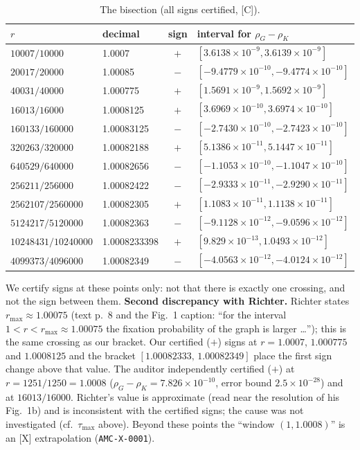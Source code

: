 \documentclass[10pt]{article}
\newcommand{\tier}[1]{\textsf{[#1]}}
\newcommand{\tC}{\tier{C}}
\newcommand{\tX}{\tier{X}}
\begin{document}
\begin{table}[h]\centering\small
\caption{The bisection (all signs certified, \tC{}).}
\begin{tabular}{llcl}\toprule
$r$ & decimal & sign & interval for $\rho_G-\rho_K$\\\midrule
$10007/10000$ & 1.0007 & $+$ & $[3.6138\times10^{-9},3.6139\times10^{-9}]$\\
$20017/20000$ & 1.00085 & $-$ & $[-9.4779\times10^{-10},-9.4774\times10^{-10}]$\\
$40031/40000$ & 1.000775 & $+$ & $[1.5691\times10^{-9},1.5692\times10^{-9}]$\\
$16013/16000$ & 1.0008125 & $+$ & $[3.6969\times10^{-10},3.6974\times10^{-10}]$\\
$160133/160000$ & 1.00083125 & $-$ & $[-2.7430\times10^{-10},-2.7423\times10^{-10}]$\\
$320263/320000$ & 1.00082188 & $+$ & $[5.1386\times10^{-11},5.1447\times10^{-11}]$\\
$640529/640000$ & 1.00082656 & $-$ & $[-1.1053\times10^{-10},-1.1047\times10^{-10}]$\\
$256211/256000$ & 1.00082422 & $-$ & $[-2.9333\times10^{-11},-2.9290\times10^{-11}]$\\
$2562107/2560000$ & 1.00082305 & $+$ & $[1.1083\times10^{-11},1.1138\times10^{-11}]$\\
$5124217/5120000$ & 1.00082363 & $-$ & $[-9.1128\times10^{-12},-9.0596\times10^{-12}]$\\
$10248431/10240000$ & 1.0008233398 & $+$ & $[9.829\times10^{-13},1.0493\times10^{-12}]$\\
$4099373/4096000$ & 1.00082349 & $-$ & $[-4.0563\times10^{-12},-4.0124\times10^{-12}]$\\\bottomrule
\end{tabular}
\end{table}
We certify signs at these points only: not that there is exactly one crossing, and not the sign between them. \textbf{Second discrepancy with Richter.} Richter states $r_{\max}\approx1.00075$ (text p.~8 and the Fig.~1 caption: ``for the interval $1<r<r_{\max}\approx1.00075$ the fixation probability of the graph is larger \dots''); this is the same crossing as our bracket. Our certified ($+$) signs at $r=1.0007$, $1.000775$ and $1.0008125$ and the bracket $[1.00082333,\,1.00082349]$ place the first sign change above that value. The auditor independently certified ($+$) at $r=1251/1250=1.0008$ ($\rho_G-\rho_K=7.826\times10^{-10}$, error bound $2.5\times10^{-28}$) and at $16013/16000$. Richter's value is approximate (read near the resolution of his Fig.~1b) and is inconsistent with the certified signs; the cause was not investigated (cf.\ $\tau_{\max}$ above). Beyond these points
the ``window $(1,1.0008)$'' is an \tX{} extrapolation (\texttt{AMC-X-0001}).
\end{document}
